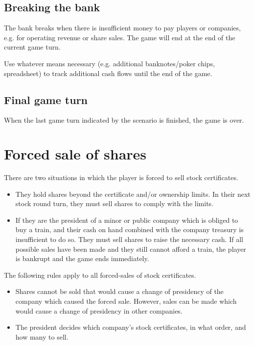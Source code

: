 \documentclass{article}
\begin{document}
\begin{CJK}{UTF8}{min}
\begin{multicols}{2}
\subsection{Breaking the bank}
\label{endgame-bank-break}
The bank breaks when there is insufficient money to pay players or
companies, e.g. for operating revenue or share sales. The game will
end at the end of the current game turn.

Use whatever means necessary (e.g. additional banknotes/poker chips,
spreadsheet) to track additional cash flows until the end of the game.

\subsection{Final game turn}

When the last game turn indicated by the scenario is finished, the game is over.


\section{Forced sale of shares}

There are two situations in which the player is forced to sell stock
certificates.
\begin{itemize}
\item They hold shares beyond the certificate and/or ownership
  limits. In their next stock round turn, they must sell shares to
  comply with the limits.

\item If they are the president of a minor or public company which is
  obliged to buy a train, and their cash on hand combined with the
  company treasury is insufficient to do so. They must sell shares to
  raise the necessary cash. If all possible sales have been made and
  they still cannot afford a train, the player is bankrupt and the
  game ends immediately.
\end{itemize}

The following rules apply to all forced-sales of stock certificates.
\begin{itemize}
\item Shares cannot be sold that would cause a change of presidency of
  the company which caused the forced sale. However, sales can be made
  which would cause a change of presidency in other companies.

\item The president decides which company's stock certificates, in
  what order, and how many to sell.


\end{itemize}
\end{multicols}
\end{CJK}
\end{document}
